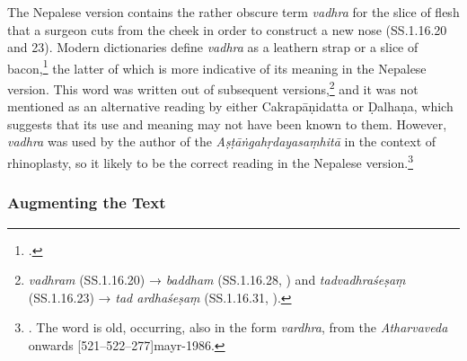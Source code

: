 The Nepalese version contains the rather obscure term \emph{vadhra} for the slice
of flesh that a surgeon cuts from the cheek in order to construct a new nose
(SS.1.16.20 and 23). Modern dictionaries define \emph{vadhra} as a leathern strap
or a slice of bacon,\footcites[1385]{apte-prac}[917]{moni-sans} the latter of
which is more indicative of its meaning in the Nepalese version. This word was
written out of subsequent versions,\footnote{\emph{vadhram} (SS.1.16.20) →
    \emph{baddham} (SS.1.16.28, \cite[81]{vulgate}) and \emph{tadvadhraśeṣaṃ}
    (SS.1.16.23) → \emph{tad ardhaśeṣaṃ} (SS.1.16.31, \cite[81]{vulgate}).} and it was
    not mentioned as an alternative reading by either Cakrapāṇidatta or Ḍalhaṇa, which
    suggests that its use and meaning may not have been known to them. However,
    \emph{vadhra} was used by the author of the \emph{Aṣṭāṅgahṛdayasaṃhitā} in the
    context of rhinoplasty, so it likely to be the correct reading in the Nepalese
    version.\footnote{. The word is old, occurring, also in the
        form \emph{vardhra}, from the \emph{Atharvaveda} onwards
        [521--522--277]{mayr-1986}.}


%

\subsubsection{Augmenting the Text}

